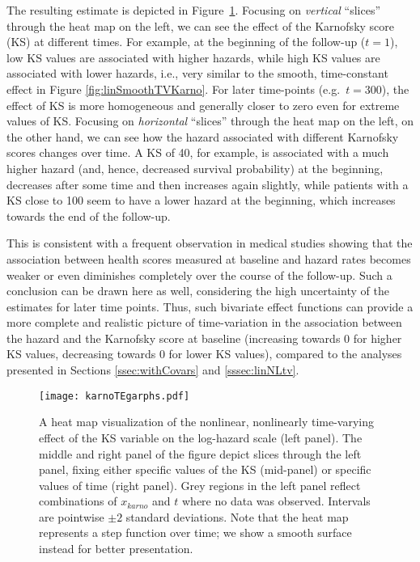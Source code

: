 \documentclass[submit]{smj}
\begin{document}
The resulting estimate is depicted in Figure~\ref{fig:karnoTensor}.
Focusing on \emph{vertical} ``slices'' through the heat map on the left, we can
see the effect of the Karnofsky score (KS) at different times.
For example, at the beginning of the follow-up ($t=1$), low KS values are
associated with higher hazards, while high KS values are associated with lower
hazards, i.e., very similar to the smooth, time-constant effect in Figure
\ref{fig:linSmoothTVKarno}. For later time-points (e.g.\ $t=300$), the effect of
KS is more homogeneous and generally closer to zero even for extreme values of KS.
Focusing on \emph{horizontal} ``slices'' through the heat map on the left,
on the other hand, we can see how the hazard associated with different Karnofsky
scores changes over time. A KS of 40, for example, is associated with a much
higher hazard (and, hence, decreased survival probability) at the beginning,
decreases after some time and then increases again slightly, while patients with
a KS close to 100 seem to have a lower hazard at the beginning, which
increases towards the end of the follow-up.

This is consistent with a frequent observation in medical studies showing that
the association between health scores measured at baseline and hazard rates becomes
weaker or even diminishes completely over the course of the follow-up.
Such a conclusion can be drawn here as well,
considering the high uncertainty of the estimates for later time points.
Thus, such bivariate effect functions can provide a more complete and realistic
picture of time-variation in the association between the hazard and the Karnofsky
score at baseline (increasing towards 0 for higher KS values, decreasing towards
0 for lower KS values), compared to the analyses presented in
Sections \ref{ssec:withCovars} and \ref{sssec:linNLtv}.

\begin{figure}[!h]
\begin{center}
\texttt{[image: karnoTEgarphs.pdf]}
\vspace{-10pt}
\caption{A heat map visualization of the nonlinear, nonlinearly time-varying
effect of the KS variable on the log-hazard scale (left panel).
The middle and right panel of the figure depict slices through the left panel,
fixing either specific values of the KS (mid-panel) or specific values
of time (right panel). Grey regions in the left panel reflect combinations of
$x_{karno}$ and $t$ where no data was observed. Intervals are pointwise $\pm 2$ standard deviations. Note that the heat map represents a step function over time; we show a smooth surface instead for better presentation.}
\label{fig:karnoTensor}
\end{center}
\end{figure}
\end{document}

